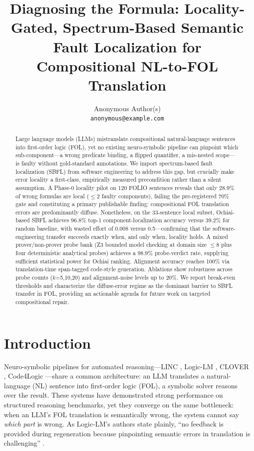 \documentclass[11pt,letterpaper]{article}
\title{\textbf{Diagnosing the Formula: Locality-Gated, Spectrum-Based Semantic Fault Localization for Compositional NL-to-FOL Translation}}
\author{
  Anonymous Author(s)\\
  \texttt{anonymous@example.com}
}
\date{}
\begin{document}
\maketitle

\begin{abstract}
Large language models (LLMs) mistranslate compositional natural-language sentences into first-order logic (FOL), yet no existing neuro-symbolic pipeline can pinpoint which sub-component—a wrong predicate binding, a flipped quantifier, a mis-nested scope—is faulty without gold-standard annotations. We import spectrum-based fault localization (SBFL) from software engineering to address this gap, but crucially make error locality a first-class, empirically measured precondition rather than a silent assumption. A Phase-0 locality pilot on 120 FOLIO sentences reveals that only 28.9\% of wrong formulas are local ($\leq$2 faulty components), failing the pre-registered 70\% gate and constituting a primary publishable finding: compositional FOL translation errors are predominantly diffuse. Nonetheless, on the 33-sentence local subset, Ochiai-based SBFL achieves 96.8\% top-1 component-localization accuracy versus 39.2\% for random baseline, with wasted effort of 0.008 versus 0.5—confirming that the software-engineering transfer succeeds exactly when, and only when, locality holds. A mixed prover/non-prover probe bank (Z3 bounded model checking at domain size $\leq$8 plus four deterministic analytical probes) achieves a 98.9\% probe-verdict rate, supplying sufficient statistical power for Ochiai ranking. Alignment accuracy reaches 100\% via translation-time span-tagged code-style generation. Ablations show robustness across probe counts ($k$=5,10,20) and alignment-noise levels up to 20\%. We report break-even thresholds and characterize the diffuse-error regime as the dominant barrier to SBFL transfer in FOL, providing an actionable agenda for future work on targeted compositional repair.
\end{abstract}

\section{Introduction}

Neuro-symbolic pipelines for automated reasoning—LINC \citep{Olausson2023}, Logic-LM \citep{Pan2023}, CLOVER \citep{Ryu2025}, Code4Logic \citep{Liu2025}—share a common architecture: an LLM translates a natural-language (NL) sentence into first-order logic (FOL), a symbolic solver reasons over the result. These systems have demonstrated strong performance on structured reasoning benchmarks, yet they converge on the same bottleneck: when an LLM's FOL translation is semantically wrong, the system cannot say \emph{which part} is wrong. As Logic-LM's authors state plainly, ``no feedback is provided during regeneration because pinpointing semantic errors in translation is challenging'' \citep{Pan2023}.
\end{document}
